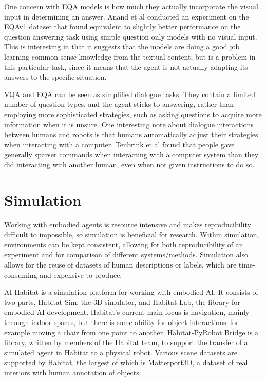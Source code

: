 One concern with EQA models is how much they actually incorporate the visual input in determining an answer. Anand et al conducted an experiment on the EQAv1 dataset that found equivalent to slightly better performance on the question answering task using simple question only models with no visual input\cite{blindfolded}. This is interesting in that it suggests that the models are doing a good job learning common sense knowledge from the textual content, but is a problem in this particular task, since it means that the agent is not actually adapting its answers to the specific situation. 

VQA and EQA can be seen as simplified dialogue tasks. They contain a limited number of question types, and the agent sticks to answering, rather than employing more sophisticated strategies, such as asking questions to acquire more information when it is unsure. One interesting note about dialogue interactions between humans and robots is that humans automatically adjust their strategies when interacting with a computer. Tenbrink et al found that people gave generally sparser commands when interacting with a computer system than they did interacting with another human, even when not given instructions to do so\cite{Tenbrink:2010qf}. 

\section{Simulation}
Working with embodied agents is resource intensive and makes reproducibility difficult to impossible, so simulation is beneficial for research. Within simulation, environments can be kept consistent, allowing for both reproducibility of an experiment and for comparison of different systems/methods. Simulation also allows for the reuse of datasets of human descriptions or labels, which are time-consuming and expensive to produce.

AI Habitat is a simulation platform for working with embodied AI\cite{habitat19iccv}. It consists of two parts, Habitat-Sim, the 3D simulator, and Habitat-Lab, the library for embodied AI development. Habitat's current main focus is navigation, mainly through indoor spaces, but there is some ability for object interactions--for example moving a chair from one point to another. Habitat-PyRobot Bridge is a library, written by members of the Habitat team, to support the transfer of a simulated agent in Habitat to a physical robot\cite{Kadian_2020}. Various scene datasets are supported by Habitat, the largest of which is Matterport3D, a dataset of real interiors with human annotation of objects\cite{matterport}.
